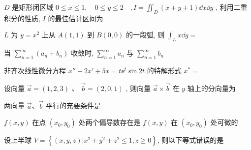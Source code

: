 \begin{ti}
	$D$ 是矩形闭区域 $0 \leqslant x \leqslant 1, \quad 0 \leqslant y \leqslant 2 \quad, I=\iint_{D}(x+y+1) \dd{x} \dd{y}$ , 利用二重积分的性质, $I$ 的最佳估计区间为 \kuo
\end{ti}

\begin{ti}
	$L$ 为 $y=x^2$ 上从 $A(1,1)$ 到 $B(0,0)$ 的一段弧, 则 $\int_{L}x\dd{y}=$ \kuo
\end{ti}

\begin{ti}
	当 $\sum_{n=1}^{\infty}\left(a_{n}+b_{n}\right)$ 收敛时, $\sum_{n=1}^{\infty} a_{n}$ 与 $\sum_{n=1}^{\infty} b_{n}$ \kuo
\end{ti}

\begin{ti}
	非齐次线性微分方程 $x''-2 x'+5 x=t \ee^{t} \sin 2 t$ 的特解形式 $x^*=$ \kuo
\end{ti}

\begin{ti}
	设向量 $\vec{a}=(1,2,3)$ 、 $\vec{b}=(2,0,1)$ , 则向量 $\vec{a}\times\vec{b}$ 在 $y$ 轴上的分向量为 \kuo
\end{ti}

\begin{ti}
	两向量 $\vec{a}$、$\vec{b}$ 平行的充要条件是 \kuo
\end{ti}

\begin{ti}
	$f(x,y)$ 在点 $(x_0,y_0)$ 处两个偏导数存在是 $f(x,y)$ 在 $(x_0,y_0)$ 处可微的 \kuo
\end{ti}

\begin{ti}
	设上半球 $V=\left\{(x, y, z) | x^{2}+y^{2}+z^{2} \leqslant 1, z \geqslant 0\right\}$, 则以下等式错误的是 \kuo
\end{ti}


